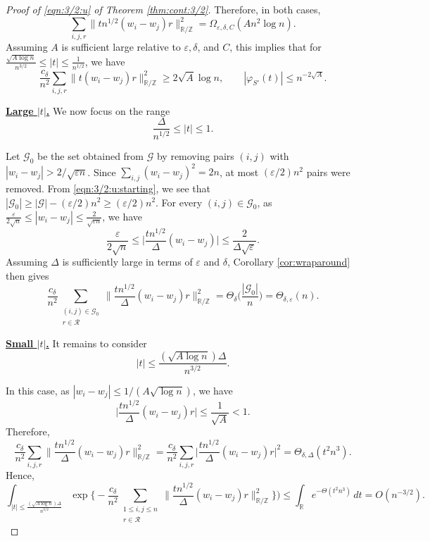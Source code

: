 \documentclass[10pt,a4paper]{amsart}
\newcommand\CG{{\mathcal G}}
\newcommand\CR{{\mathcal R}}
\newcommand\R{{\mathbb{R}}}
\newcommand\Z{{\mathbb{Z}}}
\newcommand\eps{{\varepsilon}}
\begin{document}
\begin{proof}[Proof of \eqref{eqn:3/2:u} of Theorem \ref{thm:cont:3/2}]
Therefore, in both cases,
\[
\sum_{i,j,r} \|t n^{1/2} (w_{i}-w_{j})r\|_{\R/\Z}^{2} =\Omega_{\eps,\delta,C}(A n^{2} \log n).
\]
Assuming $A$ is sufficient large relative to $\eps,\delta$, and $C$, this implies that for $\frac{ \sqrt{A\log n}}{n^{3/2}} \le |t| \le \frac{1}{n^{1/2}}$, we have
\[
\frac{c_{\delta}}{n^{2}}\sum_{i,j,r} \| t (w_{i} - w_{j}) r \|_{\R/\Z}^{2} \ge 2\sqrt{A} \log n, \qquad |\varphi_{S'}(t)| \le n^{-2\sqrt{A}}.
\]


\underline{\bf Large $|t|$.} We now focus on the range 
$$\frac{\Delta}{n^{1/2}} \le |t|\le 1.$$  

Let $\CG_{0}$ be the set obtained from $\CG$ by removing pairs $(i,j)$ with $|w_{i} - w_{j}| > 2/\sqrt{\eps n}$. Since $\sum_{i,j}(w_{i}-w_{j})^2=2n$, at most $(\eps/2)n^2$ pairs were removed. From \eqref{eqn:3/2:u:starting}, we see that $|\CG_{0}|\ge |\CG|-(\eps/2)n^2\ge (\eps/2)n^2$. For every $(i,j)\in \CG_{0}$, as $\frac{\eps}{2\sqrt{n}} \le |w_{i} - w_{j}| \le \frac{2}{\sqrt{\eps n}}$, we have
\[
\frac{\eps}{2\sqrt{n}}\le \Big|\frac{t n^{1/2}}{\Delta} (w_{i}-w_{j})\Big|\le \frac{2}{\Delta \sqrt{\eps}}.
\]
Assuming $\Delta$ is sufficiently large in terms of $\eps$ and $\delta$, Corollary \ref{cor:wraparound} then gives
\[
\frac{c_{\delta}}{n^{2}}
\sum_{\substack{(i,j)\in \CG_{0}\\ r\in \CR}}
\Big\| \frac{t n^{1/2}}{\Delta} (w_i-w_j) r \Big\|_{\R/\Z}^{2}
= \Theta_{\delta}\!\Big(\frac{|\CG_{0}|}{n}\Big)
= \Theta_{\delta,\varepsilon}(n).
\]

\underline{\bf Small $|t|$.}  
It remains to consider 
$$|t| \le \frac{(\sqrt{A\log n})\Delta}{n^{3/2}}.$$

In this case, as $|w_{i}- w_{j}| \le 1/(A \sqrt{\log n})$, we have
\[
\Big|\frac{t n^{1/2}}{\Delta} (w_{i}-w_{j})r\Big|\le \frac{1}{\sqrt{A}}<1.
\]
Therefore,
\[
\frac{c_{\delta}}{n^{2}} \sum_{i,j,r} \Big\|\frac{t n^{1/2}}{\Delta} (w_{i}-w_{j})r\Big\|_{\R/\Z}^{2}
= \frac{c_{\delta}}{n^{2}} \sum_{i,j,r} \Big|\frac{t n^{1/2}}{\Delta}(w_{i}-w_{j})r\Big|^{2}
=\Theta_{\delta,\Delta}(t^{2} n^{3}).
\]
Hence,
\[
\int_{|t|\le \frac{(\sqrt{A\log n})\Delta}{n^{3/2}}} \exp\Big\{- \frac{c_{\delta}}{n^{2}} \sum_{\substack{1\le i,j \le n \\r \in \CR}} \Big\| \frac{t n^{1/2}}{\Delta} (w_{i}-w_{j}) r\Big\|_{\R/\Z}^{2}\Big\}\Big)
\le \int_{\R} e^{-\Theta(t^{2} n^{3})}\, dt
= O(n^{-3/2}).
\]
\end{proof}
\end{document}
